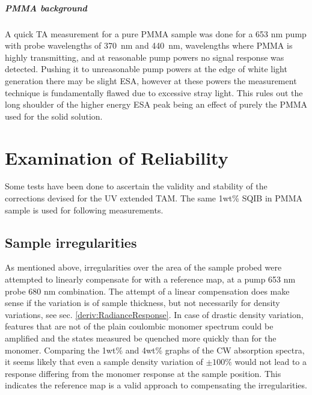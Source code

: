 \documentclass[twoside,openright,listof=numbered]{scrreprt}
\begin{document}
\paragraph{PMMA background}
A quick TA measurement for a pure PMMA sample was done for a 653 nm pump with probe wavelengths of \SI{370}{\nano\meter} and \SI{440}{\nano\meter},  wavelengths where PMMA is highly transmitting, and at reasonable pump powers no signal response was detected. Pushing it to unreasonable pump powers at the edge of white light generation there may be slight ESA, however at these powers the measurement technique is fundamentally flawed due to excessive stray light. This rules out the long shoulder of the higher energy ESA peak being an effect of purely the PMMA used for the solid solution.




\chapter{Examination of Reliability}\label{chpt:reliability}
Some tests have been done to ascertain the validity and stability of the corrections devised for the UV extended TAM. The same 1wt\% SQIB in PMMA sample is used for following measurements.
\section{Sample irregularities}
As mentioned above, irregularities over the area of the sample probed were attempted to linearly compensate for with a reference map, at a pump 653 nm probe 680 nm combination. The attempt of a linear compensation does make sense if the variation is of sample thickness, but not necessarily for density variations, see sec. \ref{deriv:RadianceResponse}. In case of drastic density variation, features that are not of the plain coulombic monomer spectrum could be amplified and the states measured be quenched more quickly than for the monomer. Comparing the 1wt\% and 4wt\% graphs of the CW absorption spectra, it seems likely that even a sample density variation of $\pm100\%$ would not lead to a response differing from the monomer response at the sample position. This indicates the reference map is a valid approach to compensating the irregularities.
\end{document}
